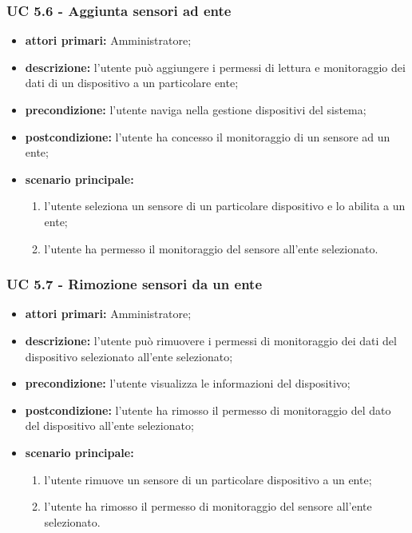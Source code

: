 			\subsubsection{UC 5.6 - Aggiunta sensori ad ente}
			\begin{itemize}
				\item \textbf{attori primari:} Amministratore;
				\item \textbf{descrizione:} l'utente può aggiungere i permessi di lettura e monitoraggio dei dati di un dispositivo a un particolare ente;
				\item \textbf{precondizione:} l'utente naviga nella gestione dispositivi del sistema;
				\item \textbf{postcondizione:} l'utente ha concesso il monitoraggio di un sensore ad un ente;
				\item \textbf{scenario principale:}
				\begin{enumerate}
					\item{l'utente seleziona un sensore di un particolare dispositivo e lo abilita a un ente;}
					\item{l'utente ha permesso il monitoraggio del sensore all'ente selezionato.}
				\end{enumerate}
			\end{itemize}
			
			\subsubsection{UC 5.7 - Rimozione sensori da un ente}
			\begin{itemize}
				\item \textbf{attori primari:} Amministratore;
				\item \textbf{descrizione:} l'utente può rimuovere i permessi di monitoraggio dei dati del dispositivo selezionato all'ente selezionato;
				\item \textbf{precondizione:} l'utente visualizza le informazioni del dispositivo;
				\item \textbf{postcondizione:} l'utente ha rimosso il permesso di monitoraggio del dato del dispositivo all'ente selezionato;
				\item \textbf{scenario principale:}
				\begin{enumerate}
					\item{l'utente rimuove un sensore di un particolare dispositivo a un ente;}
					\item{l'utente ha rimosso il permesso di monitoraggio del sensore all'ente selezionato.}
				\end{enumerate}
			\end{itemize}

